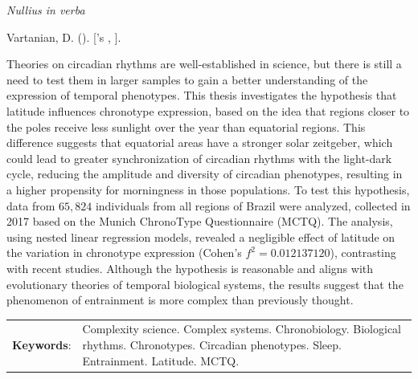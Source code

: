 \documentclass[
12pt,
openright,
oneside,
a4paper,
chapter=TITLE,
section=TITLE,
french,
spanish,
brazil,
english
]{abntex2}
\renewcommand{\epigraphname}{Epigraph}
\renewcommand{\resumoname}{Abstract}
\renewcommand{\epigraphname}{Epígrafe}
\renewcommand{\resumoname}{Resumo}
\renewcommand{\epigraphname}{Epígrafe}
\renewcommand{\resumoname}{Resumen}
\renewcommand{\epigraphname}{Épigraphe}
\renewcommand{\resumoname}{Résumé}
\providecommand{\imprimiruniversidade}{}
\providecommand{\imprimirtipodetituloacademico}{}
\newenvironment{resumoenv}[1][\resumoname]{
  \pretextualchapter{#1}
  \begingroup
  \setlength{\parindent}{0cm}
  \setlength{\parskip}{\smallskipamount} %
  \AtBeginEnvironment{tabular}{\normalsize}
  \renewcommand{\arraystretch}{1}
  \setlength{\aboverulesep}{0ex}
  \setlength{\belowrulesep}{0ex}
  \setlength{\arrayrulewidth}{0pt}
  \setlength{\tabcolsep}{0cm}
  \vspace{-\smallskipamount} %
  \begin{SingleSpace}
}{
  \end{SingleSpace}
  \cleardoublepage
  \endgroup
}
\renewcommand{\arraystretch}{1.5}
\begin{document}

\begin{epigrafe}[] %
\vspace*{\fill} %
\begin{flushright}
\textit{Nullius in verba}\footnotemark{}

\end{flushright}
\end{epigrafe}


\begin{resumoenv}[\resumoname]
Vartanian, D. ({\imprimirdata}). \textit{\imprimirtitulo} [{\imprimirtipodetituloacademico}'s {\imprimirtipotrabalho}, {\imprimiruniversidade}].


Theories on circadian rhythms are well-established in science, but there
is still a need to test them in larger samples to gain a better
understanding of the expression of temporal phenotypes. This thesis
investigates the hypothesis that latitude influences chronotype
expression, based on the idea that regions closer to the poles receive
less sunlight over the year than equatorial regions. This difference
suggests that equatorial areas have a stronger solar zeitgeber, which
could lead to greater synchronization of circadian rhythms with the
light-dark cycle, reducing the amplitude and diversity of circadian
phenotypes, resulting in a higher propensity for morningness in those
populations. To test this hypothesis, data from \(65,824\) individuals
from all regions of Brazil were analyzed, collected in 2017 based on the
Munich ChronoType Questionnaire (MCTQ). The analysis, using nested
linear regression models, revealed a negligible effect of latitude on
the variation in chronotype expression (Cohen's \(f^2 = 0.012137120\)),
contrasting with recent studies. Although the hypothesis is reasonable
and aligns with evolutionary theories of temporal biological systems,
the results suggest that the phenomenon of entrainment is more complex
than previously thought.


\begin{tabular}{p{2.3cm} p{13.6cm}}
  \textbf{Keywords}: & Complexity science. Complex systems. Chronobiology. Biological rhythms. Chronotypes. Circadian phenotypes. Sleep. Entrainment. Latitude. MCTQ.
\end{tabular}
\end{resumoenv}
\end{document}
